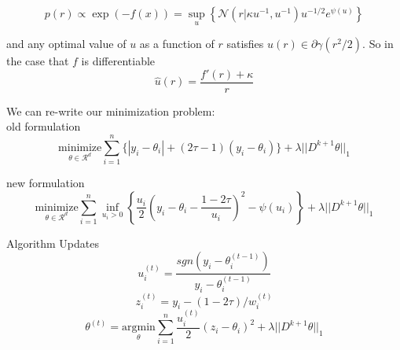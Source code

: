 \documentclass[]{article}
\begin{document}
$$p(r) \propto \exp(-f(x)) = \sup_u\left\{\mathcal{N}(r|\kappa u^{-1}, u^{-1})u^{-1/2}e^{\psi(u)}\right\}$$

and any optimal value of $u$ as a function of $r$ satisfies $\widehat{u}(r) \in \partial\gamma(r^2/2)$. So in the case that $f$ is differentiable
$$\widehat{u}(r) = \frac{f'(r)+\kappa}{r}$$
 
We can re-write our minimization problem:\\

old formulation
$$\underset{\theta \in \mathcal{R}^d}{\text{minimize}}\sum_{i=1}^n\{|y_i - \theta_i| + (2\tau-1)(y_i-\theta_i)\} + \lambda||D^{k+1}\theta||_1$$

new formulation
$$\underset{\theta \in \mathcal{R}^d}{\text{minimize}}\sum_{i=1}^n \inf_{u_i>0}\left\{\frac{u_i}{2}\left(y_i - \theta_i - \frac{1-2\tau}{u_i}\right)^2 - \psi(u_i)\right\} + \lambda||D^{k+1}\theta||_1$$

Algorithm Updates
$$u_i^{(t)} = \frac{sgn(y_i - \theta_i^{(t-1)})}{y_i - \theta_i^{(t-1)}}$$
$$z_i^{(t)} = y_i - (1-2\tau)/w_i^{(t)}$$
$$\theta^{(t)} = \underset{\theta}{\text{argmin}} \sum_{i=1}^n \frac{u_i^{(t)}}{2}(z_i - \theta_i)^2 + \lambda||D^{k+1}\theta||_1$$
\end{document}
